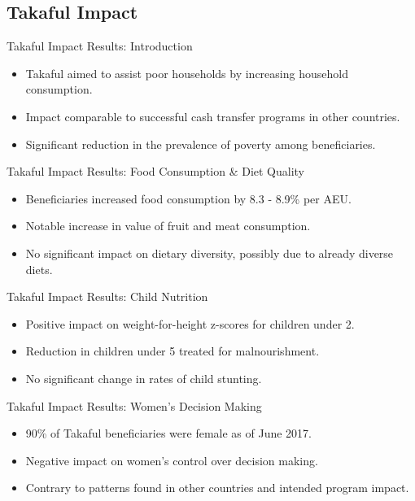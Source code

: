 \documentclass{beamer}
\begin{document}
\subsection{Takaful Impact}

\begin{frame}{Takaful Impact Results: Introduction}
\begin{itemize}
    \item Takaful aimed to assist poor households by increasing household consumption.
    \item Impact comparable to successful cash transfer programs in other countries.
    \item Significant reduction in the prevalence of poverty among beneficiaries.
\end{itemize}
\end{frame}

\begin{frame}{Takaful Impact Results: Food Consumption \& Diet Quality}
\begin{itemize}
    \item Beneficiaries increased food consumption by 8.3 - 8.9\% per AEU.
    \item Notable increase in value of fruit and meat consumption.
    \item No significant impact on dietary diversity, possibly due to already diverse diets.
\end{itemize}
\end{frame}

\begin{frame}{Takaful Impact Results: Child Nutrition}
\begin{itemize}
    \item Positive impact on weight-for-height z-scores for children under 2.
    \item Reduction in children under 5 treated for malnourishment.
    \item No significant change in rates of child stunting.
\end{itemize}
\end{frame}

\begin{frame}{Takaful Impact Results: Women’s Decision Making}
\begin{itemize}
    \item 90\% of Takaful beneficiaries were female as of June 2017.
    \item Negative impact on women’s control over decision making.
    \item Contrary to patterns found in other countries and intended program impact.
\end{itemize}
\end{frame}
\end{document}
